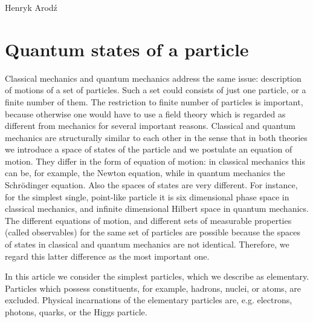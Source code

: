 \begin{artengenv}{Henryk Arod\'z}
\section{Quantum states of a particle }



Classical mechanics and quantum mechanics address the same issue: description of motions of a set of particles. Such a set could consists of just one particle, or a finite number of them. The restriction to finite number of particles is important, because otherwise one would have to use a field theory which is regarded as different from mechanics for several important reasons. Classical and quantum mechanics are structurally similar to each other in the sense that in both theories we introduce a space of states of the particle and we postulate an equation of motion. They differ in the form of equation of motion: in classical mechanics this can be, for example, the Newton equation, while in quantum mechanics the Schr\"odinger equation. Also
 the spaces of states are very different. For instance, for the simplest single, point-like particle it is six dimensional phase space in classical mechanics, and infinite dimensional Hilbert space in quantum mechanics. The different equations of motion, and different sets of measurable properties (called observables) for the same set of particles are possible because the spaces of states in classical and quantum mechanics are not identical. Therefore, we regard this latter difference as the most important one. 

In this article we consider the simplest particles, which we describe as elementary. Particles which possess constituents, for example, hadrons, nuclei, or atoms, are excluded. Physical incarnations of the elementary particles are, e.g. electrons, photons, quarks, or the Higgs particle. 


\end{artengenv}
